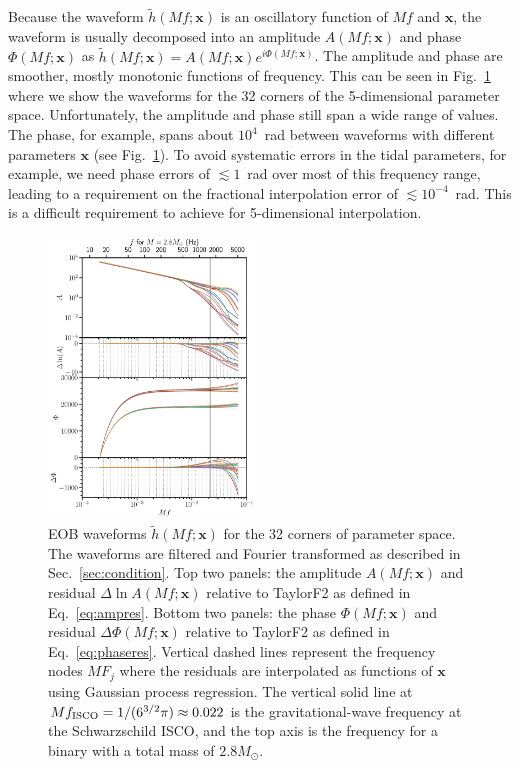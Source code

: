 \documentclass[prd,aps,letter,twocolumn,floatfix,notitlepage,nofootinbib]{revtex4-1}
\def\bx{\mathbf{x}}
\begin{document}
Because the waveform $\tilde h(Mf; \bx)$ is an oscillatory function of $Mf$ and $\bx$, the waveform is usually decomposed into an amplitude $A(Mf; \bx)$ and phase $\Phi(Mf; \bx)$ as $\tilde h(Mf; \bx) = A(Mf; \bx) e^{i\Phi(Mf; \bx)}$. The amplitude and phase are smoother, mostly monotonic functions of frequency. 
This can be seen in Fig.~\ref{fig:hoff} where we show the waveforms for the 32 corners of the 5-dimensional parameter space. Unfortunately, the amplitude and phase still span a wide range of values. The phase, for example, spans about $10^4$~rad between waveforms with different parameters $\bx$ (see Fig.~\ref{fig:hoff}). To avoid systematic errors in the tidal parameters, for example, we need phase errors of $\lesssim 1$~rad over most of this frequency range, leading to a requirement on the fractional interpolation error of $\lesssim 10^{-4}$~rad. This is a difficult requirement to achieve for 5-dimensional interpolation. 

\begin{figure}[htb]
\centering
\includegraphics[width=0.49\textwidth]{hoff.pdf}
\caption{EOB waveforms $\tilde h(Mf; \bx)$ for the 32 corners of parameter space. The waveforms are filtered and Fourier transformed as described in Sec.~\ref{sec:condition}. Top two panels: the amplitude $A(Mf; \bx)$ and residual $\Delta\ln A(Mf; \bx)$ relative to TaylorF2 as defined in Eq.~\eqref{eq:ampres}. Bottom two panels: the phase $\Phi(Mf; \bx)$ and residual $\Delta\Phi(Mf; \bx)$ relative to TaylorF2 as defined in Eq.~\eqref{eq:phaseres}. Vertical dashed lines represent the frequency nodes $MF_j$ where the residuals are interpolated as functions of $\bx$ using Gaussian process regression. The vertical solid line at $Mf_{\rm ISCO} = 1/(6^{3/2}\pi) \approx 0.022$ is the gravitational-wave frequency at the Schwarzschild ISCO, and the top axis is the frequency for a binary with a total mass of $2.8M_\odot$.}
\label{fig:hoff}
\end{figure}
\end{document}
